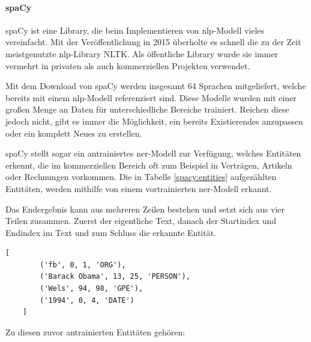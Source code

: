 \paragraph{spaCy}

spaCy ist eine Library, die beim Implementieren von \gls{nlp}-Modell vieles vereinfacht. Mit der Veröffentlichung in 2015 überholte es schnell die zu der Zeit meistgenutzte \gls{nlp}-Library NLTK. Als öffentliche Library wurde sie immer vermehrt in privaten als auch kommerziellen Projekten verwendet. \cite{NER-NLP}

Mit dem Download von spaCy werden insgesamt 64 Sprachen mitgeliefert, welche bereits mit einem \gls{nlp}-Modell referenziert sind. Diese Modelle wurden mit einer großen Menge an Daten für unterschiedliche Bereiche trainiert. Reichen diese jedoch nicht, gibt es immer die Möglichkeit, ein bereits Existierendes anzupassen oder ein komplett Neues zu erstellen. \cite{NER-NLP}

spaCy stellt sogar ein antrainiertes \gls{ner}-Modell zur Verfügung, welches Entitäten erkennt, die im kommerziellen Bereich oft zum Beispiel in Verträgen, Artikeln oder Rechnungen vorkommen. Die in Tabelle \ref{spacy:entities} aufgezählten Entitäten, werden mithilfe von einem vortrainierten \gls{ner}-Modell erkannt.

Das Endergebnis kann aus mehreren Zeilen bestehen und setzt sich aus vier Teilen zusammen. Zuerst der eigentliche Text, danach der Startindex und Endindex im Text und zum Schluss die erkannte Entität.

\begin{lstlisting}[caption={Beispiel für ein spaCy NER Ergebnis}]
    [
        ('fb', 0, 1, 'ORG'),
        ('Barack Obama', 13, 25, 'PERSON'),
        ('Wels', 94, 98, 'GPE'),
        ('1994', 0, 4, 'DATE')
    ]
\end{lstlisting}

Zu diesen zuvor antrainierten Entitäten gehören: \cite{NER-NLP}

